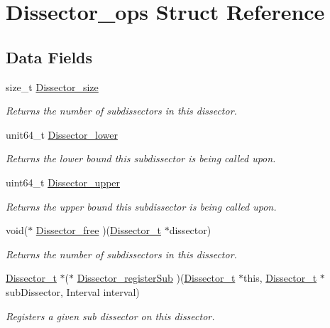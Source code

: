 \hypertarget{struct_dissector__ops}{\section{Dissector\-\_\-ops Struct Reference}
\label{struct_dissector__ops}
}
\subsection*{Data Fields}
\begin{DoxyCompactItemize}
\item 
size\-\_\-t \hyperlink{struct_dissector__ops_a8982a0368e988bc9cb93ee83d5411b99}{Dissector\-\_\-size}
\begin{DoxyCompactList}\small\item\em Returns the number of subdissectors in this dissector. \end{DoxyCompactList}\item 
unit64\-\_\-t \hyperlink{struct_dissector__ops_a12f42148d4173471c21f3b33296d9256}{Dissector\-\_\-lower}
\begin{DoxyCompactList}\small\item\em Returns the lower bound this subdissector is being called upon. \end{DoxyCompactList}\item 
uint64\-\_\-t \hyperlink{struct_dissector__ops_a3d9e177f508734b6136538e051b64699}{Dissector\-\_\-upper}
\begin{DoxyCompactList}\small\item\em Returns the upper bound this subdissector is being called upon. \end{DoxyCompactList}\item 
void($\ast$ \hyperlink{struct_dissector__ops_ad864a69acd7f1c8a503d1d2cb1ef8d90}{Dissector\-\_\-free} )(\hyperlink{struct_dissector}{Dissector\-\_\-t} $\ast$dissector)
\begin{DoxyCompactList}\small\item\em Returns the number of subdissectors in this dissector. \end{DoxyCompactList}\item 
\hyperlink{struct_dissector}{Dissector\-\_\-t} $\ast$($\ast$ \hyperlink{struct_dissector__ops_ac7b5b8ae6f666ad291eede1507effc20}{Dissector\-\_\-register\-Sub} )(\hyperlink{struct_dissector}{Dissector\-\_\-t} $\ast$this, \hyperlink{struct_dissector}{Dissector\-\_\-t} $\ast$sub\-Dissector, Interval interval)
\begin{DoxyCompactList}\small\item\em Registers a given sub dissector on this dissector. \end{DoxyCompactList}\item 

\end{DoxyCompactItemize}
